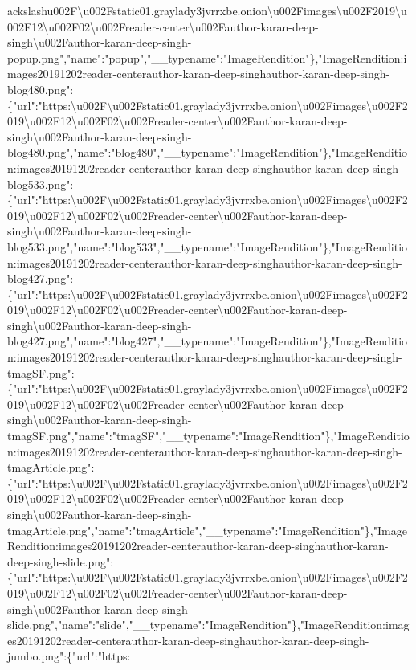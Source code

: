 ackslash{}u002F\textbackslash{}u002Fstatic01.graylady3jvrrxbe.onion\textbackslash{}u002Fimages\textbackslash{}u002F2019\textbackslash{}u002F12\textbackslash{}u002F02\textbackslash{}u002Freader-center\textbackslash{}u002Fauthor-karan-deep-singh\textbackslash{}u002Fauthor-karan-deep-singh-popup.png","name":"popup","\_\_typename":"ImageRendition"\},"ImageRendition:images20191202reader-centerauthor-karan-deep-singhauthor-karan-deep-singh-blog480.png":\{"url":"https:\textbackslash{}u002F\textbackslash{}u002Fstatic01.graylady3jvrrxbe.onion\textbackslash{}u002Fimages\textbackslash{}u002F2019\textbackslash{}u002F12\textbackslash{}u002F02\textbackslash{}u002Freader-center\textbackslash{}u002Fauthor-karan-deep-singh\textbackslash{}u002Fauthor-karan-deep-singh-blog480.png","name":"blog480","\_\_typename":"ImageRendition"\},"ImageRendition:images20191202reader-centerauthor-karan-deep-singhauthor-karan-deep-singh-blog533.png":\{"url":"https:\textbackslash{}u002F\textbackslash{}u002Fstatic01.graylady3jvrrxbe.onion\textbackslash{}u002Fimages\textbackslash{}u002F2019\textbackslash{}u002F12\textbackslash{}u002F02\textbackslash{}u002Freader-center\textbackslash{}u002Fauthor-karan-deep-singh\textbackslash{}u002Fauthor-karan-deep-singh-blog533.png","name":"blog533","\_\_typename":"ImageRendition"\},"ImageRendition:images20191202reader-centerauthor-karan-deep-singhauthor-karan-deep-singh-blog427.png":\{"url":"https:\textbackslash{}u002F\textbackslash{}u002Fstatic01.graylady3jvrrxbe.onion\textbackslash{}u002Fimages\textbackslash{}u002F2019\textbackslash{}u002F12\textbackslash{}u002F02\textbackslash{}u002Freader-center\textbackslash{}u002Fauthor-karan-deep-singh\textbackslash{}u002Fauthor-karan-deep-singh-blog427.png","name":"blog427","\_\_typename":"ImageRendition"\},"ImageRendition:images20191202reader-centerauthor-karan-deep-singhauthor-karan-deep-singh-tmagSF.png":\{"url":"https:\textbackslash{}u002F\textbackslash{}u002Fstatic01.graylady3jvrrxbe.onion\textbackslash{}u002Fimages\textbackslash{}u002F2019\textbackslash{}u002F12\textbackslash{}u002F02\textbackslash{}u002Freader-center\textbackslash{}u002Fauthor-karan-deep-singh\textbackslash{}u002Fauthor-karan-deep-singh-tmagSF.png","name":"tmagSF","\_\_typename":"ImageRendition"\},"ImageRendition:images20191202reader-centerauthor-karan-deep-singhauthor-karan-deep-singh-tmagArticle.png":\{"url":"https:\textbackslash{}u002F\textbackslash{}u002Fstatic01.graylady3jvrrxbe.onion\textbackslash{}u002Fimages\textbackslash{}u002F2019\textbackslash{}u002F12\textbackslash{}u002F02\textbackslash{}u002Freader-center\textbackslash{}u002Fauthor-karan-deep-singh\textbackslash{}u002Fauthor-karan-deep-singh-tmagArticle.png","name":"tmagArticle","\_\_typename":"ImageRendition"\},"ImageRendition:images20191202reader-centerauthor-karan-deep-singhauthor-karan-deep-singh-slide.png":\{"url":"https:\textbackslash{}u002F\textbackslash{}u002Fstatic01.graylady3jvrrxbe.onion\textbackslash{}u002Fimages\textbackslash{}u002F2019\textbackslash{}u002F12\textbackslash{}u002F02\textbackslash{}u002Freader-center\textbackslash{}u002Fauthor-karan-deep-singh\textbackslash{}u002Fauthor-karan-deep-singh-slide.png","name":"slide","\_\_typename":"ImageRendition"\},"ImageRendition:images20191202reader-centerauthor-karan-deep-singhauthor-karan-deep-singh-jumbo.png":\{"url":"https:\textbackslas
